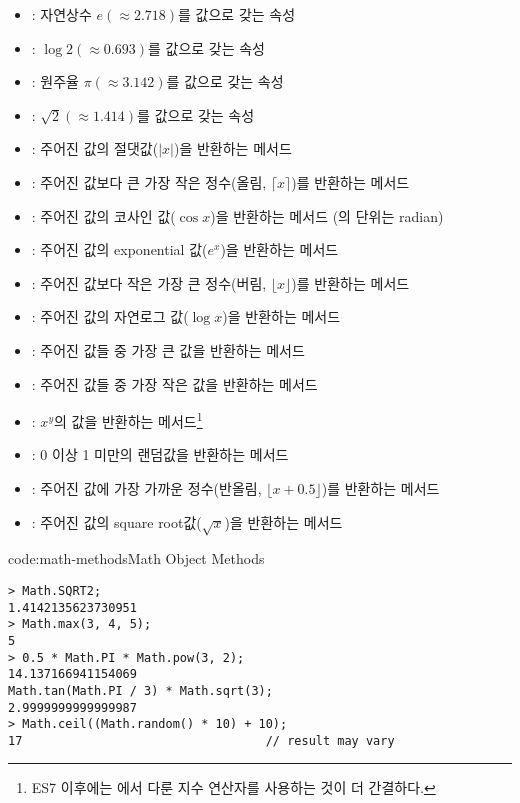 \begin{itemize}
    \item {}: 자연상수 $e (\approx 2.718)$를 값으로 갖는 속성
    \item {}: $\log 2 (\approx 0.693)$를 값으로 갖는 속성
    \item {}: 원주율 $\pi (\approx 3.142)$를 값으로 갖는 속성
    \item {}: $\sqrt 2 (\approx 1.414)$를 값으로 갖는 속성
    \item {}: 주어진 값의 절댓값($|x|$)을 반환하는 메서드
    \item {}: 주어진 값보다 큰 가장 작은 정수(올림, $\lceil x\rceil$)를 반환하는 메서드
    \item {}: 주어진 값의 코사인 값($\cos x$)을 반환하는 메서드 (의 단위는 radian)
    \item {}: 주어진 값의 exponential 값($e^x$)을 반환하는 메서드
    \item {}: 주어진 값보다 작은 가장 큰 정수(버림, $\lfloor x\rfloor$)를 반환하는 메서드
    \item {}: 주어진 값의 자연로그 값($\log x$)을 반환하는 메서드
    \item {}: 주어진 값들 중 가장 큰 값을 반환하는 메서드
    \item {}: 주어진 값들 중 가장 작은 값을 반환하는 메서드
    \item {}: $x^y$의 값을 반환하는 메서드\footnote{ES7 이후에는 에서 다룬 지수 연산자를 사용하는 것이 더 간결하다.}
    \item {}: 0 이상 1 미만의 랜덤값을 반환하는 메서드
    \item {}: 주어진 값에 가장 가까운 정수(반올림, $\lfloor x + 0.5\rfloor$)를 반환하는 메서드
    \item {}: 주어진 값의 square root값($\sqrt{x}$)을 반환하는 메서드
\end{itemize}

\begin{codeenv}{code:math-methods}{Math Object Methods}\begin{verbatim}
> Math.SQRT2;
1.4142135623730951
> Math.max(3, 4, 5);
5
> 0.5 * Math.PI * Math.pow(3, 2);
14.137166941154069
Math.tan(Math.PI / 3) * Math.sqrt(3);
2.9999999999999987
> Math.ceil((Math.random() * 10) + 10);
17                                  // result may vary
\end{verbatim}
\end{codeenv}
